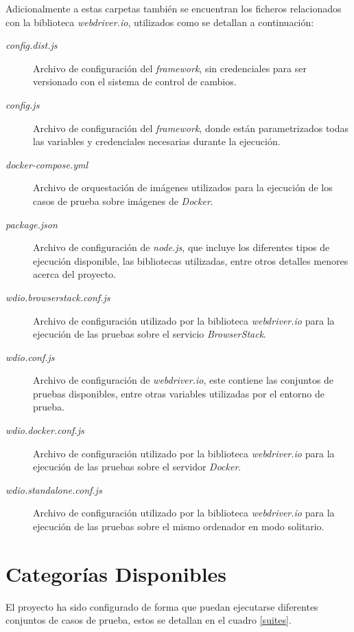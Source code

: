 Adicionalmente a estas carpetas también se encuentran los ficheros relacionados
con la biblioteca \emph{webdriver.io}, utilizados como se detallan a
continuación:

\begin{description}
    \item [\emph{config.dist.js}] Archivo de configuración del \emph{framework},
    sin credenciales para ser versionado con el sistema de control de cambios.
\item [\emph{config.js}] Archivo de configuración del \emph{framework}, donde
    están parametrizados todas las variables y credenciales necesarias durante
    la ejecución.
\item [\emph{docker-compose.yml}] Archivo de orquestación de imágenes utilizados
    para la ejecución de los casos de prueba sobre imágenes de \emph{Docker}.
\item [\emph{package.json}] Archivo de configuración de \emph{node.js}, que
    incluye los diferentes tipos de ejecución disponible, las bibliotecas
    utilizadas, entre otros detalles menores acerca del proyecto.
\item [\emph{wdio.browserstack.conf.js}] Archivo de configuración utilizado por
    la biblioteca \emph{webdriver.io} para la ejecución de las pruebas sobre el
    servicio \emph{BrowserStack}.
\item [\emph{wdio.conf.js}] Archivo de configuración de \emph{webdriver.io},
    este contiene las conjuntos de pruebas disponibles, entre otras variables
    utilizadas por el entorno de prueba.
\item [\emph{wdio.docker.conf.js}] Archivo de configuración utilizado por la
    biblioteca \emph{webdriver.io} para la ejecución de las pruebas sobre el
    servidor \emph{Docker}.
\item [\emph{wdio.standalone.conf.js}] Archivo de configuración utilizado por la
    biblioteca \emph{webdriver.io} para la ejecución de las pruebas sobre el
    mismo ordenador en modo solitario.
\end{description}

\section{Categorías Disponibles}
El proyecto ha sido configurado de forma que puedan ejecutarse diferentes
conjuntos de casos de prueba, estos se detallan en el cuadro \ref{suites}.

